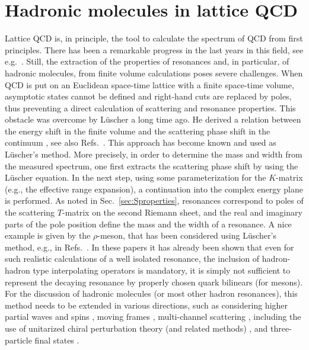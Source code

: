 
\section{Hadronic molecules in lattice QCD}
\label{sec:lattice}

Lattice QCD is, in principle, the tool to calculate the spectrum of QCD from
first principles. There has been a remarkable progress in the last years in this
field, see
e.g.~\cite{Durr:2008zz,Baron:2010bv,Edwards:2011jj,Liu:2012ze,Liu:2016kbb}.
Still, the extraction of the properties of resonances and, in particular, of
hadronic molecules, from finite volume {calculations}  poses severe
challenges.
When QCD is put on an Euclidean space-time lattice {with a finite
space-time volume, asymptotic states cannot be defined and right-hand cuts are replaced by
poles, thus preventing a direct calculation of scattering and resonance
properties.}
This obstacle was overcome by L\"uscher a long time ago. He derived a relation
between the energy shift in the finite volume and the scattering phase shift in
the continuum \cite{Luscher:1990ux,Luscher:1986pf}, see also
Refs.~\cite{Wiese:1988qy,DeGrand:1990ip}.
This approach has become  known and used as L\"uscher's method.
More precisely, in order to determine the mass and width from the measured
spectrum, one first extracts the scattering phase shift by using the L\"uscher
equation. In the next step, using some parameterization for the $K$-matrix
(e.g., the effective range expansion), a continuation into the complex energy
plane is performed. As noted in Sec.~\ref{sec:Sproperties}, resonances
correspond to poles of the scattering $T$-matrix on the second Riemann sheet,
and the real and imaginary parts of the pole position define the mass and the
width of a resonance. A nice example is given by the $\rho$-meson, that has been
considered using L\"uscher's method, e.g., in
Refs.~\cite{Feng:2010es,Lang:2011mn,Aoki:2011yj,Dudek:2012xn}.
In these papers it has already been shown that even for such realistic
calculations of a well isolated resonance,
the inclusion of {hadron-hadron type interpolating operators} is mandatory,
it is simply not sufficient to represent the decaying resonance by properly
chosen quark bilinears {(for mesons)}.
For the discussion of hadronic molecules (or most other hadron resonances), this
method needs to be extended in various directions, such as considering higher
partial waves and spins
\cite{Bernard:2008ax,Luu:2011ep,Konig:2011nz,Konig:2011ti,Briceno:2012yi,
Gockeler:2012yj}, moving frames
\cite{Rummukainen:1995vs,Bour:2011ef,Davoudi:2011md,Fu:2011xz,Leskovec:2012gb,
Gockeler:2012yj}, multi-channel scattering
\cite{Liu:2005kr,Lage:2009zv,Bernard:2010fp,Doring:2011ip,Li:2012bi,Guo:2012hv},
including the use of unitarized chiral perturbation theory (and related methods)
\cite{Doring:2011vk,MartinezTorres:2011pr,Doring:2011nd,Albaladejo:2012jr,
Wu:2014vma,Hu:2016shf}, and three-particle final states
\cite{Kreuzer:2010ti,Polejaeva:2012ut,Briceno:2012rv,Hansen:2014eka,
Meissner:2014dea,Hansen:2015zga,Hansen:2015zta,Hansen:2016ync,Hansen:2016fzj,Guo:2017ism}.


